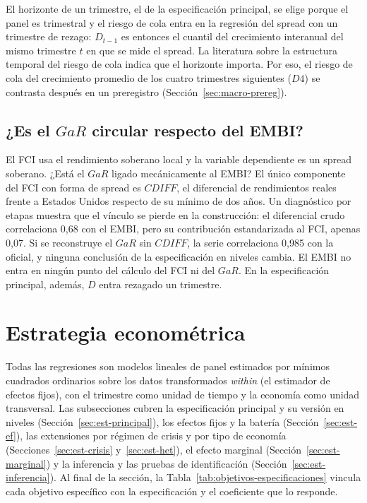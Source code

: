 El horizonte de un trimestre, el de la especificación principal, se elige porque el panel es trimestral y el riesgo de cola entra en la regresión del spread con un trimestre de rezago: $D_{t-1}$ es entonces el cuantil del crecimiento interanual del mismo trimestre $t$ en que se mide el spread. La literatura sobre la estructura temporal del riesgo de cola \citep{AdrianEtAl2022} indica que el horizonte importa. Por eso, el riesgo de cola del crecimiento promedio de los cuatro trimestres siguientes ($D4$) se contrasta después en un preregistro (Sección~\ref{sec:macro-prereg}).

\subsection{¿Es el \texorpdfstring{$GaR$}{GaR} circular respecto del EMBI?}
\label{sec:ryr-endogeneidad}

El FCI usa el rendimiento soberano local y la variable dependiente es un spread soberano. ¿Está el $GaR$ ligado mecánicamente al EMBI? El único componente del FCI con forma de spread es $CDIFF$, el diferencial de rendimientos reales frente a Estados Unidos respecto de su mínimo de dos años. Un diagnóstico por etapas muestra que el vínculo se pierde en la construcción: el diferencial crudo correlaciona 0,68 con el EMBI, pero su contribución estandarizada al FCI, apenas 0,07. Si se reconstruye el $GaR$ sin $CDIFF$, la serie correlaciona 0,985 con la oficial, y ninguna conclusión de la especificación en niveles cambia. El EMBI no entra en ningún punto del cálculo del FCI ni del $GaR$. En la especificación principal, además, $D$ entra rezagado un trimestre.

\section{Estrategia econométrica}
\label{sec:estrategia}

Todas las regresiones son modelos lineales de panel estimados por mínimos cuadrados ordinarios sobre los datos transformados \textit{within} (el estimador de efectos fijos), con el trimestre como unidad de tiempo y la economía como unidad transversal. Las subsecciones cubren la especificación principal y su versión en niveles (Sección~\ref{sec:est-principal}), los efectos fijos y la batería (Sección~\ref{sec:est-ef}), las extensiones por régimen de crisis y por tipo de economía (Secciones~\ref{sec:est-crisis} y~\ref{sec:est-het}), el efecto marginal (Sección~\ref{sec:est-marginal}) y la inferencia y las pruebas de identificación (Sección~\ref{sec:est-inferencia}). Al final de la sección, la Tabla~\ref{tab:objetivos-especificaciones} vincula cada objetivo específico con la especificación y el coeficiente que lo responde.

